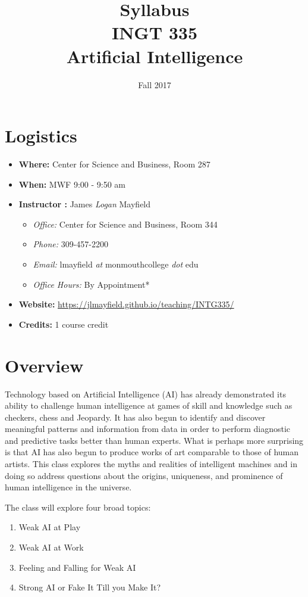 \documentclass[nobib]{tufte-handout}
\title{Syllabus \\ INGT 335 \\ Artificial Intelligence}
\author{}
\date{ Fall 2017 }
\begin{document}
\maketitle

\section{Logistics}
\begin{itemize}
\item \textbf{Where: } Center for Science and Business, Room 287
\item \textbf{When: } MWF 9:00 - 9:50 am
\item \textbf{Instructor :} James \textit{Logan} Mayfield
\begin{itemize}
\item \textit{Office: } Center for Science and Business, Room 344
\item \textit{Phone: } 309-457-2200
\item \textit{Email: } lmayfield \textit{at} monmouthcollege \textit{dot} edu
\item \textit{Office Hours: } By Appointment*
\end{itemize}
\item \textbf{Website: } \url{https://jlmayfield.github.io/teaching/INTG335/}
\item \textbf{Credits: } 1 course credit
\end{itemize}

\section{Overview}

Technology based on Artificial Intelligence (AI) has already demonstrated its ability to challenge human intelligence at games of skill and knowledge such as checkers, chess and Jeopardy. It has also begun to identify and discover meaningful patterns and information from data in order to perform diagnostic and predictive tasks better than human experts.  What is perhaps more surprising is that AI has also begun to produce works of art comparable to those of human artists. This class explores the myths and realities of intelligent machines and in doing so address questions about the origins, uniqueness, and prominence of human intelligence in the universe.

The class will explore four broad topics:
\begin{enumerate}
\item Weak AI at Play
\item Weak AI at Work
\item Feeling and Falling for Weak AI
\item Strong AI or Fake It Till you Make It?
\end{enumerate}
\end{document}
